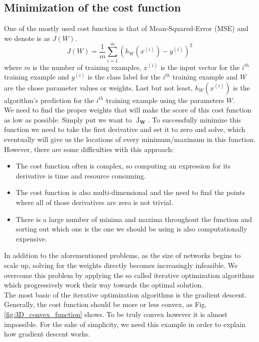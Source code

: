 \subsection{Minimization of the cost function}
One of the mostly used cost function is that of Mean-Squared-Error (\ac{MSE}) and we denote is as $J(W)$. 
\begin{equation}
J(W) = \frac{1}{m}\sum_{i=1}^m(h_W(x^{(i)})-y^{(i)})^2
\label{Eq:MSE_cost_function}
\end{equation}
where $m$ is the number of training examples, $x^{(i)}$ is the input vector for the $i^{th}$ training example and $y^{(i)}$ is the class label for the $i^{th}$ training example and $W$ are the chose parameter values or weights. Last but not least, $h_W(x^{(i)})$ is the algorithm's prediction for the $i^{th}$ training example using the parameters $W$.\cite{mccormickml}\\
We need to find the proper weights that will make the score of  this cost function as low as possible. Simply put we want to $\mathop{J(W)}_{\textbf{W}}$. To successfully minimize this function we need to take the first derivative and set it to zero and solve, which eventually will give us the locations of every minimum/maximum in this function. However, there are some difficulties with this approach:
\begin{itemize}
\item The cost function often is complex, so computing an expression for its derivative is time and resource consuming.
\item The cost function is also multi-dimensional and the need to find the points where all of those derivatives are zero is not trivial.
\item There is a large number of minima and maxima throughout the function and sorting out which one is the one we should be using is also computationally expensive. 
\end{itemize}
In addition to the aforementioned problems, as the size of networks begins to scale up, solving for the weights directly becomes increasingly infeasible. We overcome this problem by applying the so called iterative optimization algorithms which progressively work their way towards the optimal solution.\\
The most basic of the iterative optimization algorithms is the gradient descent. Generally, the cost function should be more or less convex, as Fig. \ref{fig:3D_convex_function} shows. To be truly convex however it is almost impossible. For the sake of simplicity, we need this example in order to explain how gradient descent works. \\
